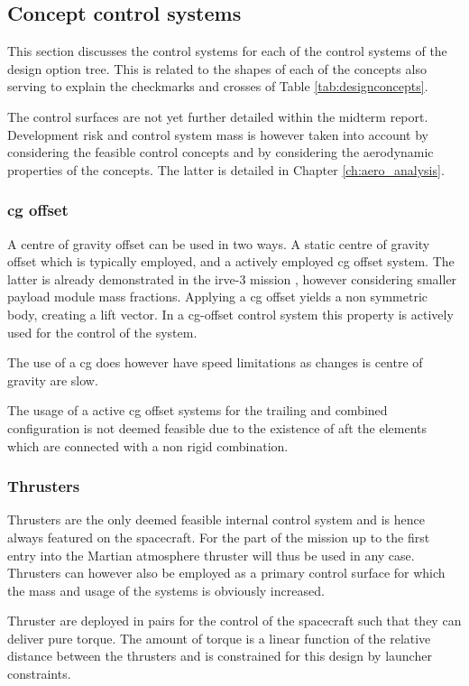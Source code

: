 \subsection{Concept control systems} \label{sec:ccs}
This section discusses the control systems for each of the control systems of the design option tree. This is related to the shapes of each of the concepts also serving to explain the checkmarks and crosses of Table \ref{tab:designconcepts}. 

The control surfaces are not yet further detailed within the midterm report. Development risk and control system mass is however taken into account by considering the feasible control concepts and by considering the aerodynamic properties of the concepts. The latter is detailed in Chapter \ref{ch:aero_analysis}.

\subsubsection{\gls{cg} offset}
A centre of gravity offset can be used in two ways. A static centre of gravity offset which is typically employed, and a actively employed \gls{cg} offset system. The latter is already demonstrated in the \gls{irve}-3 mission \cite{Dillman2012}, however considering smaller payload module mass fractions. Applying a \gls{cg} offset yields  a non symmetric body, creating a lift vector. In a \gls{cg}-offset control system this property is actively used for the control of the system. 

The use of a \gls{cg} does however have speed limitations as changes is centre of gravity are slow.

The usage of a active \gls{cg} offset systems for the trailing and combined configuration is not deemed feasible due to the existence of aft the elements which are connected with a non rigid combination.

\subsubsection{Thrusters}
Thrusters are the only deemed feasible internal control system and is hence always featured on the spacecraft. For the part of the mission up to the first entry into the Martian atmosphere thruster will thus be used in any case. Thrusters can however also be employed as a primary control surface for which the mass and usage of the systems is obviously increased.  

Thruster are deployed in pairs for the control of the spacecraft such that they can deliver pure torque. The amount of torque is a linear function of the relative distance between the thrusters and is constrained for this design by launcher constraints. 

